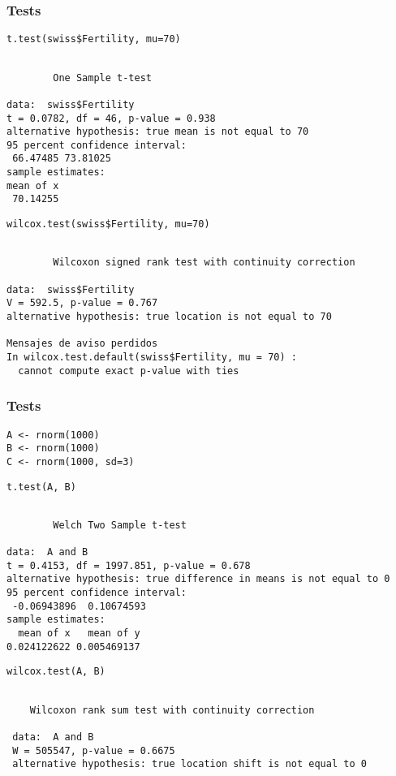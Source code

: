\documentclass{beamer}
\begin{document}
\begin{frame}[fragile]
\frametitle{Tests}
\label{sec-2-5}



\lstset{language=R}
\begin{lstlisting}
t.test(swiss$Fertility, mu=70)
\end{lstlisting}


\begin{verbatim}

        One Sample t-test

data:  swiss$Fertility 
t = 0.0782, df = 46, p-value = 0.938
alternative hypothesis: true mean is not equal to 70 
95 percent confidence interval:
 66.47485 73.81025 
sample estimates:
mean of x 
 70.14255
\end{verbatim}


\lstset{language=R}
\begin{lstlisting}
wilcox.test(swiss$Fertility, mu=70)
\end{lstlisting}


\begin{verbatim}

        Wilcoxon signed rank test with continuity correction

data:  swiss$Fertility 
V = 592.5, p-value = 0.767
alternative hypothesis: true location is not equal to 70 

Mensajes de aviso perdidos
In wilcox.test.default(swiss$Fertility, mu = 70) :
  cannot compute exact p-value with ties
\end{verbatim}
\end{frame}
\begin{frame}[fragile]
\frametitle{Tests}
\label{sec-2-6}


\lstset{language=R}
\begin{lstlisting}
A <- rnorm(1000)
B <- rnorm(1000)
C <- rnorm(1000, sd=3)
\end{lstlisting}



\lstset{language=R}
\begin{lstlisting}
t.test(A, B)
\end{lstlisting}


\begin{verbatim}

        Welch Two Sample t-test

data:  A and B 
t = 0.4153, df = 1997.851, p-value = 0.678
alternative hypothesis: true difference in means is not equal to 0 
95 percent confidence interval:
 -0.06943896  0.10674593 
sample estimates:
  mean of x   mean of y 
0.024122622 0.005469137
\end{verbatim}


\lstset{language=R}
\begin{lstlisting}
wilcox.test(A, B)
\end{lstlisting}

\begin{verbatim}
 
 	Wilcoxon rank sum test with continuity correction
 
 data:  A and B 
 W = 505547, p-value = 0.6675
 alternative hypothesis: true location shift is not equal to 0
\end{verbatim}
\end{frame}
\end{document}
